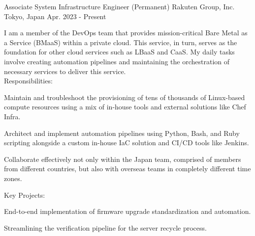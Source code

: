 

\begin{cventries}

  \cventry
    {Associate System Infrastructure Engineer (Permanent)} %
    {Rakuten Group, Inc.} %
    {Tokyo, Japan} %
    {Apr. 2023 - Present} %
    {
      \begin{cvjobdesc} %
        I am a member of the DevOps team that provides mission-critical Bare Metal as a Service (BMaaS) within a private cloud. This service, in turn, serves as the foundation for other cloud services such as LBaaS and CaaS. My daily tasks involve creating automation pipelines and maintaining the orchestration of necessary services to deliver this service.
        \vspace{2.0mm}
        \\Responsibilities:
        \begin{cvbullets}
        \item {Maintain and troubleshoot the provisioning of tens of thousands of Linux-based compute resources using a mix of in-house tools and external solutions like Chef Infra.}
        \item {Architect and implement automation pipelines using Python, Bash, and Ruby scripting alongside a custom in-house IaC solution and CI/CD tools like Jenkins.}
        \item {Collaborate effectively not only within the Japan team, comprised of members from different countries, but also with overseas teams in completely different time zones.}
        \end{cvbullets}
        \vspace{2.0mm}
        Key Projects:
        \begin{cvbullets}
        \item {End-to-end implementation of firmware upgrade standardization and automation.}
        \item {Streamlining the verification pipeline for the server recycle process.}
        \end{cvbullets}
      \end{cvjobdesc}
    }


\end{cventries}
